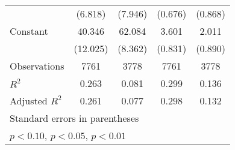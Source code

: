 \begin{table}[htbp]
\begin{tabular}{l*{4}{c}}
                    &     (6.818)         &     (7.946)         &     (0.676)         &     (0.868)         \\
[1em]
Constant            &      40.346\sym{***}&      62.084\sym{***}&       3.601\sym{***}&       2.011\sym{**} \\
                    &    (12.025)         &     (8.362)         &     (0.831)         &     (0.890)         \\
\hline
Observations        &        7761         &        3778         &        7761         &        3778         \\
\(R^{2}\)           &       0.263         &       0.081         &       0.299         &       0.136         \\
Adjusted \(R^{2}\)  &       0.261         &       0.077         &       0.298         &       0.132         \\
\hline\hline
\multicolumn{5}{l}{\footnotesize Standard errors in parentheses}\\
\multicolumn{5}{l}{\footnotesize \sym{*} \(p<0.10\), \sym{**} \(p<0.05\), \sym{***} \(p<0.01\)}\\
\end{tabular}
\end{table}
